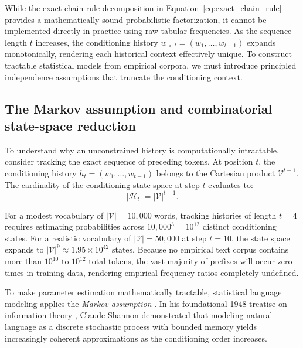 \documentclass[../../../main.tex]{subfiles}
\begin{document}
While the exact chain rule decomposition in Equation~\eqref{eq:exact_chain_rule} provides a mathematically sound probabilistic factorization, it cannot be implemented directly in practice using raw tabular frequencies. As the sequence length $t$ increases, the conditioning history $w_{<t} = (w_1, \dots, w_{t-1})$ expands monotonically, rendering each historical context effectively unique. To construct tractable statistical models from empirical corpora, we must introduce principled independence assumptions that truncate the conditioning context.

\subsection{The Markov assumption and combinatorial state-space reduction}
\label{subsec:markov_assumption}

To understand why an unconstrained history is computationally intractable, consider tracking the exact sequence of preceding tokens. At position $t$, the conditioning history $h_t = (w_1, \dots, w_{t-1})$ belongs to the Cartesian product $\mathcal{V}^{t-1}$. The cardinality of the conditioning state space at step $t$ evaluates to:
\begin{equation}
|\mathcal{H}_t| = |\mathcal{V}|^{t-1}.
\label{eq:unconstrained_history_cardinality}
\end{equation}

For a modest vocabulary of $|\mathcal{V}| = 10{,}000$ words, tracking histories of length $t = 4$ requires estimating probabilities across $10{,}000^3 = 10^{12}$ distinct conditioning states. For a realistic vocabulary of $|\mathcal{V}| = 50{,}000$ at step $t=10$, the state space expands to $|\mathcal{V}|^9 \approx 1.95 \times 10^{42}$ states. Because no empirical text corpus contains more than $10^{10}$ to $10^{12}$ total tokens, the vast majority of prefixes will occur zero times in training data, rendering empirical frequency ratios completely undefined.

To make parameter estimation mathematically tractable, statistical language modeling applies the \textit{Markov assumption} \citep{jurafsky2024}. In his foundational 1948 treatise on information theory \citep{shannon1948}, Claude Shannon demonstrated that modeling natural language as a discrete stochastic process with bounded memory yields increasingly coherent approximations as the conditioning order increases.
\end{document}
